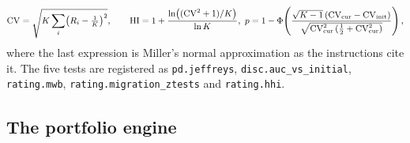 \begin{equation}
  {\small\begin{gathered}
  \mathrm{CV}=\sqrt{K\sum_i\bigl(R_i-\tfrac1K\bigr)^2},\qquad
  \mathrm{HI}=1+\frac{\ln\bigl((\mathrm{CV}^2+1)/K\bigr)}{\ln K},\
  p=1-\Phi\!\left(\frac{\sqrt{K-1}\,(\mathrm{CV}_{\mathrm{cur}}-\mathrm{CV}_{\mathrm{init}})}{\sqrt{\mathrm{CV}_{\mathrm{cur}}^2\,(\tfrac12+\mathrm{CV}_{\mathrm{cur}}^2)}}\right),
  \end{gathered}}
  \label{eq:hhi}
\end{equation}
where the last expression is Miller's normal approximation as the instructions cite it. The five tests are registered as \texttt{pd.jeffreys}, \texttt{disc.auc\_vs\_initial}, \texttt{rating.mwb}, \texttt{rating.migration\_ztests} and \texttt{rating.hhi}.

\subsection{The portfolio engine}

